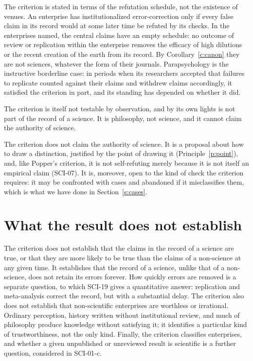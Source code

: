 \documentclass{situationist-preprint}
\begin{document}
\begin{reply}
The criterion is stated in terms of the refutation schedule, not the existence of venues. An enterprise has institutionalized error-correction only if every false claim in its record would at some later time be refuted by its checks. In the enterprises named, the central claims have an empty schedule: no outcome of review or replication within the enterprise removes the efficacy of high dilutions or the recent creation of the earth from its record. By Corollary~\ref{c:canon} they are not sciences, whatever the form of their journals. Parapsychology is the instructive borderline case: in periods when its researchers accepted that failures to replicate counted against their claims and withdrew claims accordingly, it satisfied the criterion in part, and its standing has depended on whether it did.
\end{reply}

\begin{objection}
The criterion is itself not testable by observation, and by its own lights is not part of the record of a science. It is philosophy, not science, and it cannot claim the authority of science.
\end{objection}

\begin{reply}
The criterion does not claim the authority of science. It is a proposal about how to draw a distinction, justified by the point of drawing it (Principle~\ref{p:point}), and, like Popper's criterion, it is not self-refuting merely because it is not itself an empirical claim (SCI-07). It is, moreover, open to the kind of check the criterion requires: it may be confronted with cases and abandoned if it misclassifies them, which is what we have done in Section~\ref{s:cases}.
\end{reply}

\section{What the result does not establish}\label{s:not}

The criterion does not establish that the claims in the record of a science are true, or that they are more likely to be true than the claims of a non-science at any given time. It establishes that the record of a science, unlike that of a non-science, does not retain its errors forever. How quickly errors are removed is a separate question, to which SCI-19 gives a quantitative answer: replication and meta-analysis correct the record, but with a substantial delay. The criterion also does not establish that non-scientific enterprises are worthless or irrational. Ordinary perception, history written without institutional review, and much of philosophy produce knowledge without satisfying it; it identifies a particular kind of trustworthiness, not the only kind. Finally, the criterion classifies enterprises, and whether a given unpublished or unreviewed result is scientific is a further question, considered in SCI-01-c.
\end{document}
